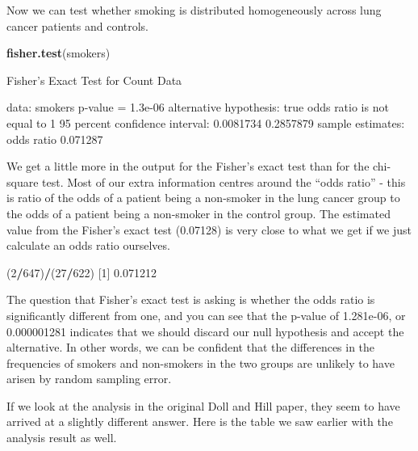 \documentclass[
]{book}
\newenvironment{Shaded}{\begin{snugshade}}{\end{snugshade}}
\newcommand{\DecValTok}[1]{\textcolor[rgb]{0.00,0.00,0.81}{#1}}
\newcommand{\FloatTok}[1]{\textcolor[rgb]{0.00,0.00,0.81}{#1}}
\newcommand{\KeywordTok}[1]{\textcolor[rgb]{0.13,0.29,0.53}{\textbf{#1}}}
\newcommand{\NormalTok}[1]{#1}
\newcommand{\OperatorTok}[1]{\textcolor[rgb]{0.81,0.36,0.00}{\textbf{#1}}}
\newcommand{\StringTok}[1]{\textcolor[rgb]{0.31,0.60,0.02}{#1}}
\begin{document}
Now we can test whether smoking is distributed homogeneously across lung cancer patients and controls.

\begin{Shaded}
\begin{Highlighting}[]
\KeywordTok{fisher.test}\NormalTok{(smokers)}

\NormalTok{    Fisher}\StringTok{'s Exact Test for Count Data}

\StringTok{data:  smokers}
\StringTok{p-value = 1.3e-06}
\StringTok{alternative hypothesis: true odds ratio is not equal to 1}
\StringTok{95 percent confidence interval:}
\StringTok{ 0.0081734 0.2857879}
\StringTok{sample estimates:}
\StringTok{odds ratio }
\StringTok{  0.071287 }
\end{Highlighting}
\end{Shaded}

We get a little more in the output for the Fisher's exact test than for the chi-square test. Most of our extra information centres around the ``odds ratio'' - this is ratio of the odds of a patient being a non-smoker in the lung cancer group to the odds of a patient being a non-smoker in the control group. The estimated value from the Fisher's exact test (0.07128) is very close to what we get if we just calculate an odds ratio ourselves.

\begin{Shaded}
\begin{Highlighting}[]
\NormalTok{(}\DecValTok{2}\OperatorTok{/}\DecValTok{647}\NormalTok{)}\OperatorTok{/}\NormalTok{(}\DecValTok{27}\OperatorTok{/}\DecValTok{622}\NormalTok{)}
\NormalTok{[}\DecValTok{1}\NormalTok{] }\FloatTok{0.071212}
\end{Highlighting}
\end{Shaded}

The question that Fisher's exact test is asking is whether the odds ratio is significantly different from one, and you can see that the p-value of 1.281e-06, or 0.000001281 indicates that we should discard our null hypothesis and accept the alternative. In other words, we can be confident that the differences in the frequencies of smokers and non-smokers in the two groups are unlikely to have arisen by random sampling error.

If we look at the analysis in the original Doll and Hill paper, they seem to have arrived at a slightly different answer. Here is the table we saw earlier with the analysis result as well.
\end{document}
